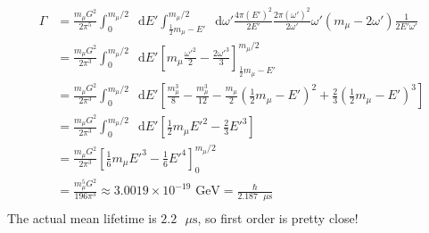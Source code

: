 \documentclass[12pt]{article}
\newcommand{\diff}{\mathop{}\!\mathrm{d}}
\theoremstyle{definition}
\begin{document}
\begin{equation*}
\begin{split}
    \Gamma
        &= \frac{m_\mu G^2}{2\pi^5} \int_0^{m_\mu/2} \diff E' \int_{\frac{1}{2}m_\mu - E'}^{m_\mu/2} \diff \omega' \frac{4\pi(E')^2}{2E'} \frac{2\pi(\omega')^2}{2\omega'} \omega'(m_\mu - 2\omega') \frac{1}{2E'\omega'} \\
        &= \frac{m_\mu G^2}{2\pi^3} \int_0^{m_\mu/2} \diff E' \left[ m_\mu \frac{\omega'^2}{2} - \frac{2\omega'^3}{3} \right]_{\frac{1}{2}m_\mu - E'}^{m_\mu/2} \\
        &= \frac{m_\mu G^2}{2\pi^3} \int_0^{m_\mu/2} \diff E' \left[ \frac{m_\mu^3}{8} - \frac{m_\mu^3}{12} - \frac{m_\mu}{2}\left( \frac{1}{2}m_\mu - E' \right)^2 + \frac{2}{3} \left( \frac{1}{2}m_\mu - E' \right)^3 \right] \\
        &= \frac{m_\mu G^2}{2\pi^3} \int_0^{m_\mu/2} \diff E' \left[ \frac{1}{2} m_\mu E'^2 - \frac{2}{3} E'^3 \right] \\
        &= \frac{m_\mu G^2}{2\pi^3} \left[ \frac{1}{6} m_\mu E'^3 - \frac{1}{6} E'^4 \right]_0^{m_\mu/2} \\
        &= \frac{m_\mu^5 G^2}{196 \pi^3} \approx 3.0019 \times 10^{-19} \text{ GeV} = \frac{\hbar}{2.187 \text{ } \mu \text{s}} \\
\end{split}
\end{equation*}
The actual mean lifetime is $2.2 \text{ }\mu\text{s}$, so first order is pretty close!
\end{document}
